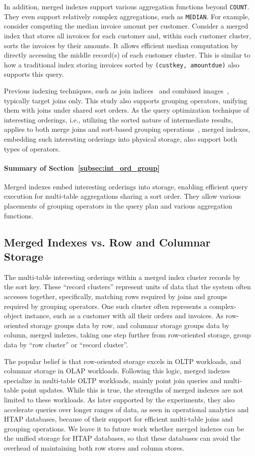 \documentclass[sigconf, pdfa, nonacm]{acmart}
\newcommand\summary[1]{\paragraph{\textbf{#1}}}
\begin{document}
In addition, merged indexes support various aggregation functions beyond \texttt{COUNT}. They even support relatively complex aggregations, such as \texttt{MEDIAN}. For example, consider computing the median invoice amount per customer. 
Consider a merged index that stores all invoices for each customer and, within each customer cluster, sorts the invoices by their amounts.
It allows efficient median computation by directly accessing the middle record(s) of each customer cluster.
This is similar to how a traditional index storing invoices sorted by \texttt{(custkey, amountdue)} also supports this query.

Previous indexing techniques, such as join indices~\cite{oneil1995joinindex, valduriez87joinindex} and combined images~\cite{haerder1978combined}, typically target joins only. This study also supports grouping operators, unifying them with joins under shared sort orders. 
As the query optimization technique of interesting orderings, i.e., utilizing the sorted nature of intermediate results, applies to both merge joins and sort-based grouping operations~\cite{selinger1979access}, merged indexes, embedding such interesting orderings into physical storage, also support both types of operators.

\summary{Summary of Section~\ref{subsec:int_ord_group}}
Merged indexes embed interesting orderings into storage, enabling efficient query execution for multi-table aggregations sharing a sort order. They allow various placements of grouping operators in the query plan and various aggregation functions.

\subsection{Merged Indexes vs. Row and Columnar Storage}\label{subsec:storage_spectrum} 

The multi-table interesting orderings within a merged index cluster records by the sort key.
These ``record clusters'' represent units of data that the system often accesses together, specifically, matching rows required by joins and groups required by grouping operators.
One such cluster often represents a complex-object instance, such as a customer with all their orders and invoices.
As row-oriented storage groups data by row, and columnar storage groups data by column, merged indexes, taking one step further from row-oriented storage, group data by ``row cluster'' or ``record cluster''.

The popular belief is that row-oriented storage excels in OLTP workloads, and columnar storage in OLAP workloads. Following this logic, merged indexes specialize in multi-table OLTP workloads, mainly point join queries and multi-table point updates. While this is true, the strengths of merged indexes are not limited to these workloads. 
As later supported by the experiments, they also accelerate queries over longer ranges of data, as seen in operational analytics and HTAP databases, because of their support for efficient multi-table joins and grouping operations.
We leave it to future work whether merged indexes can be the unified storage for HTAP databases, so that these databases can avoid the overhead of maintaining both row stores and column stores.
\end{document}

